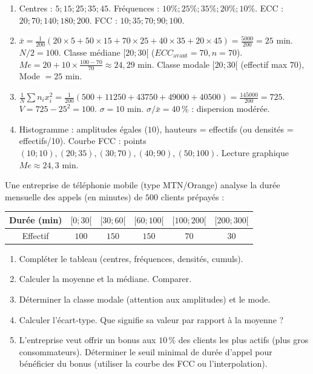 \documentclass[11pt]{article}
\begin{document}
\begin{corrige}[Exercice 1]
\begin{enumerate}
\item Centres : $5; 15; 25; 35; 45$. Fréquences : $10\%; 25\%; 35\%; 20\%; 10\%$. ECC : $20; 70; 140; 180; 200$. FCC : $10; 35; 70; 90; 100$.
\item $\bar{x} = \frac{1}{200}(20\times5 + 50\times15 + 70\times25 + 40\times35 + 20\times45) = \frac{5000}{200} = 25$ min.
$N/2=100$. Classe médiane $[20;30[$ ($ECC_{\text{avant}}=70, n=70$). $Me = 20 + 10\times\frac{100-70}{70} \approx 24,29$ min.
Classe modale $[20;30[$ (effectif max $70$), Mode $= 25$ min.
\item $\frac{1}{N}\sum n_i x_i^2 = \frac{1}{200}(500 + 11250 + 43750 + 49000 + 40500) = \frac{145000}{200} = 725$.
$V = 725 - 25^2 = 100$. $\sigma = 10$ min. $\sigma/\bar{x} = 40\,\%$ : dispersion modérée.
\item Histogramme : amplitudes égales ($10$), hauteurs = effectifs (ou densités = effectifs/10). Courbe FCC : points $(10;10), (20;35), (30;70), (40;90), (50;100)$. Lecture graphique $Me \approx 24,3$ min.
\end{enumerate}
\end{corrige}

\begin{exercice}
Une entreprise de téléphonie mobile (type MTN/Orange) analyse la durée mensuelle des appels (en minutes) de $500$ clients prépayés :
\begin{center}
\begin{tabular}{|c|c|c|c|c|c|}\hline
\rowcolor{popblueL} Durée (min) & $[0;30[$ & $[30;60[$ & $[60;100[$ & $[100;200[$ & $[200;300[$ \\ \hline
Effectif & $100$ & $150$ & $150$ & $70$ & $30$ \\ \hline
\end{tabular}
\end{center}
\begin{enumerate}
\item Compléter le tableau (centres, fréquences, densités, cumuls).
\item Calculer la moyenne et la médiane. Comparer.
\item Déterminer la classe modale (attention aux amplitudes) et le mode.
\item Calculer l'écart-type. Que signifie sa valeur par rapport à la moyenne ?
\item L'entreprise veut offrir un bonus aux $10\,\%$ des clients les plus actifs (plus gros consommateurs). Déterminer le seuil minimal de durée d'appel pour bénéficier du bonus (utiliser la courbe des FCC ou l'interpolation).
\end{enumerate}
\end{exercice}
\end{document}
